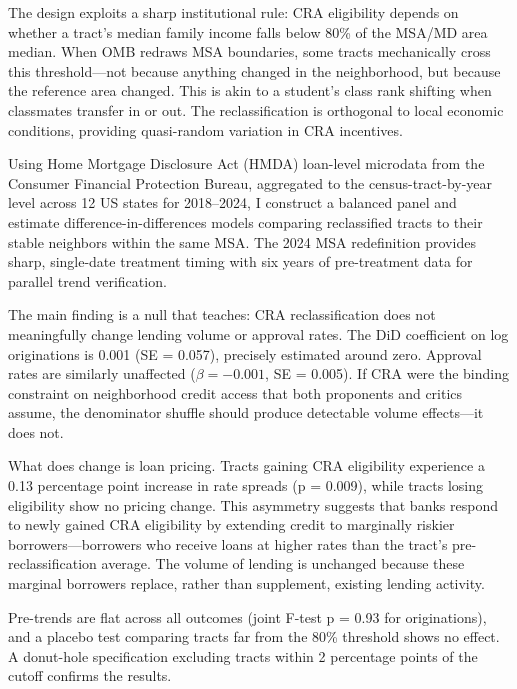 \documentclass[12pt]{article}
\begin{document}
The design exploits a sharp institutional rule: CRA eligibility depends on whether a tract's median family income falls below 80\% of the MSA/MD area median. When OMB redraws MSA boundaries, some tracts mechanically cross this threshold---not because anything changed in the neighborhood, but because the reference area changed. This is akin to a student's class rank shifting when classmates transfer in or out. The reclassification is orthogonal to local economic conditions, providing quasi-random variation in CRA incentives.

Using Home Mortgage Disclosure Act (HMDA) loan-level microdata from the Consumer Financial Protection Bureau, aggregated to the census-tract-by-year level across 12 US states for 2018--2024, I construct a balanced panel and estimate difference-in-differences models comparing reclassified tracts to their stable neighbors within the same MSA. The 2024 MSA redefinition provides sharp, single-date treatment timing with six years of pre-treatment data for parallel trend verification.

The main finding is a null that teaches: CRA reclassification does not meaningfully change lending volume or approval rates. The DiD coefficient on log originations is 0.001 (SE = 0.057), precisely estimated around zero. Approval rates are similarly unaffected ($\beta = -0.001$, SE = 0.005). If CRA were the binding constraint on neighborhood credit access that both proponents and critics assume, the denominator shuffle should produce detectable volume effects---it does not.

What does change is loan pricing. Tracts gaining CRA eligibility experience a 0.13 percentage point increase in rate spreads (p = 0.009), while tracts losing eligibility show no pricing change. This asymmetry suggests that banks respond to newly gained CRA eligibility by extending credit to marginally riskier borrowers---borrowers who receive loans at higher rates than the tract's pre-reclassification average. The volume of lending is unchanged because these marginal borrowers replace, rather than supplement, existing lending activity.

Pre-trends are flat across all outcomes (joint F-test p = 0.93 for originations), and a placebo test comparing tracts far from the 80\% threshold shows no effect. A donut-hole specification excluding tracts within 2 percentage points of the cutoff confirms the results.
\end{document}
